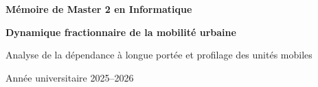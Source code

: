 \usepackage{amsmath,amssymb,amsthm}
\usepackage{mathtools}

\usepackage{graphicx}
\graphicspath{{figures/}}
\usepackage{float}
\usepackage{caption}
\usepackage{subcaption}
\usepackage{booktabs}
\usepackage{multirow}
\usepackage{array}
\usepackage{longtable}

\usepackage{tikz}
\usetikzlibrary{positioning,arrows.meta,shapes.geometric,fit,backgrounds,calc}

\usepackage{xcolor}
\usepackage[colorlinks=true,linkcolor=linkblue,citecolor=linkblue,urlcolor=linkblue]{hyperref}

\usepackage[numbers,sort&compress]{natbib}

\usepackage{enumitem}
\usepackage{fancyhdr}
\pagestyle{fancy}
\fancyhf{}
\fancyhead[L]{\leftmark}
\fancyhead[R]{\thepage}
\renewcommand{\headrulewidth}{0.4pt}

\newtheorem{definition}{Définition}[chapter]
\newtheorem{hypothese}{Hypothèse}[chapter]
\newtheorem{proposition}{Proposition}[chapter]
\newtheorem{resultat}{Résultat}[chapter]

\newcommand{\Hurst}{H}
\newcommand{\Hhat}{\widehat{H}}
\newcommand{\dt}{\Delta t}
\newcommand{\xmin}{x_{\min}}



\begin{titlepage}
\centering
\vspace*{2cm}
{\Large\bfseries Mémoire de Master 2 en Informatique\par}
\vspace{1.5cm}
{\huge\bfseries Dynamique fractionnaire de la mobilité urbaine\par}
\vspace{0.8cm}
{\LARGE Analyse de la dépendance à longue portée et profilage des unités mobiles\par}
\vspace{2cm}
{\large Année universitaire 2025--2026\par}
\vfill
\end{titlepage}


